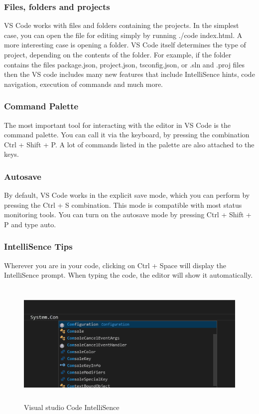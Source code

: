 \subsubsection{Files, folders and projects}
VS Code works with files and folders containing the projects. In the simplest case, you can open the file for editing simply by running ./code index.html. A more interesting case is opening a folder. VS Code itself determines the type of project, depending on the contents of the folder. For example, if the folder contains the files package.json, project.json, tsconfig.json, or .sln and .proj files then the VS code includes many new features that include IntelliSence hints, code navigation, execution of commands and much more. \cite{VSC}

\subsubsection{Command Palette}
The most important tool for interacting with the editor in VS Code is the command palette. You can call it via the keyboard, by pressing the combination Ctrl + Shift + P. A lot of commands listed in the palette are also attached to the keys. \cite{VStricks} \par

\subsubsection{Autosave}
By default, VS Code works in the explicit save mode, which you can perform by pressing the Ctrl + S combination. This mode is compatible with most status monitoring tools. You can turn on the autosave mode by pressing Ctrl + Shift + P and type auto. \cite{VStricks} \par

\subsubsection{IntelliSence Tips}
Wherever you are in your code, clicking on Ctrl + Space will display the IntelliSence prompt. When typing the code, the editor will show it automatically. \cite{VStricks} \par

\begin{figure}
\centering
\includegraphics[width=14cm, height=6cm]{img/IntelliSence.png}
\caption{Visual studio Code IntelliSence}
\end{figure}

